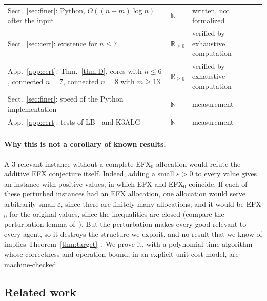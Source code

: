 \documentclass[runningheads,11pt]{llncs}
\newcommand{\efxz}{\texorpdfstring{\mbox{EFX$_0$}}{EFX0}}
\newcommand{\LBp}{\texorpdfstring{\mbox{LB$^{+}$}}{LB+}}
\begin{document}
\begin{table}[tbp]
\begin{tabular}{@{}>{\raggedright\arraybackslash}p{}ll@{}}
Sect.~\ref{sec:finer}: Python, $O((n+m)\log n)$ after the input & $\mathbb{N}$ & written, not formalized \\
Sect.~\ref{sec:cert}: existence for $n\le7$ & $\mathbb{R}_{\ge0}$ & verified by exhaustive computation \\
App.~\ref{app:cert}: Thm.~\ref{thm:D}, cores with $n\le6$, connected $n=7$, connected $n=8$ with $m\ge13$ & $\mathbb{R}_{\ge0}$ & verified by exhaustive computation \\
Sect.~\ref{sec:finer}: speed of the Python implementation & $\mathbb{N}$ & measurement \\
App.~\ref{app:cert}: tests of \LBp{} and K3ALG & $\mathbb{N}$ & measurement \\
\bottomrule
\end{tabular}
\end{table}

\paragraph{Why this is not a corollary of known results.} A $3$-relevant instance without a complete \efxz{} allocation would refute the additive EFX conjecture itself. Indeed, adding a small $\varepsilon>0$ to every value gives an instance with positive values, in which EFX and \efxz{} coincide. If each of these perturbed instances had an EFX allocation, one allocation would serve arbitrarily small $\varepsilon$, since there are finitely many allocations, and it would be \efxz{} for the original values, since the inequalities are closed (compare the perturbation lemma of~\cite{ChaudhuryGM20}). But the perturbation makes every good relevant to every agent, so it destroys the structure we exploit, and no result that we know of implies Theorem~\ref{thm:target}~\cite{Repo}. We prove it, with a polynomial-time algorithm whose correctness and operation bound, in an explicit unit-cost model, are machine-checked.

\subsection{Related work}\label{sec:related}
\end{document}
